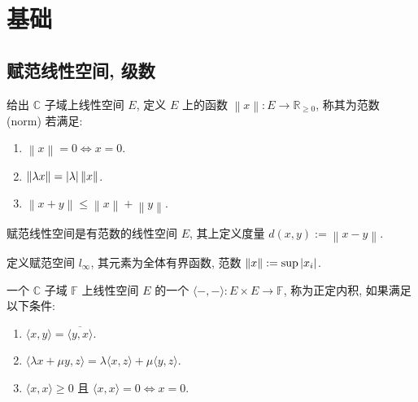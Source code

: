 \section{基础}

\subsection{赋范线性空间, 级数}

\begin{definition}[范数]
    给出 \(\mathbb{C}\) 子域上线性空间 \(E\), 定义 \(E\) 上的函数 \(\left\| x \right\| : E \to \mathbb{R}_{\geq 0}\),
    称其为范数 (norm) 若满足:

    \begin{enumerate}
        \item \(\left\|x\right\| = 0 \iff x = 0\).
        \item \(\left\| \lambda x \right\| = \abs {\lambda} \left\| x \right\|\).
        \item \(\left\| x + y \right\| \leq \left\| x \right\| + \left\| y \right\|\).
    \end{enumerate}
\end{definition}

\begin{definition}
    赋范线性空间是有范数的线性空间 \(E\), 其上定义度量 \(d(x,y) := \left\| x-y \right\|\).
\end{definition}

\begin{definition}
    定义赋范空间 \(l_\infty\), 其元素为全体有界函数, 范数 \(\left\| x \right\| := \sup \abs{x_i}\).
\end{definition}

\begin{definition}[正定内积]
    一个 \(\mathbb{C}\) 子域 \(\mathbb{F}\) 上线性空间 \(E\) 的一个 \(\langle - , - \rangle : E \times E \to \mathbb{F}\),
    称为正定内积, 如果满足以下条件:

    \begin{enumerate}
        \item \(\langle x,y \rangle = \overline{\langle y,x \rangle}\).
        \item \(\langle \lambda x + \mu y,z \rangle = \lambda \langle x,z \rangle + \mu \langle y,z \rangle\).
        \item \(\langle x,x \rangle \geq 0\) 且 \(\langle x,x \rangle = 0 \iff x = 0\).
    \end{enumerate}
\end{definition}

